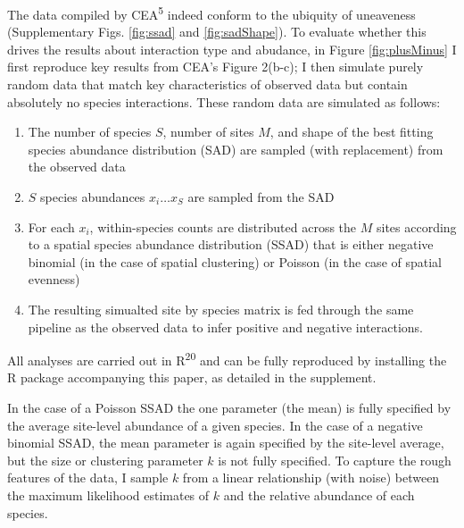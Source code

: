 \documentclass[]{article}
\providecommand{\tightlist}{%
  \setlength{\itemsep}{0pt}\setlength{\parskip}{0pt}}
\begin{document}
The data compiled by CEA\textsuperscript{5} indeed conform to the
ubiquity of uneaveness (Supplementary Figs. \ref{fig:ssad} and
\ref{fig:sadShape}). To evaluate whether this drives the results about
interaction type and abudance, in Figure \ref{fig:plusMinus} I first
reproduce key results from CEA's Figure 2(b-c); I then simulate purely
random data that match key characteristics of observed data but contain
absolutely no species interactions. These random data are simulated as
follows:

\begin{enumerate}
\def\labelenumi{\arabic{enumi})}
\tightlist
\item
  The number of species \(S\), number of sites \(M\), and shape of the
  best fitting species abundance distribution (SAD) are sampled (with
  replacement) from the observed data
\item
  \(S\) species abundances \(x_i \ldots x_S\) are sampled from the SAD
\item
  For each \(x_i\), within-species counts are distributed across the
  \(M\) sites according to a spatial species abundance distribution
  (SSAD) that is either negative binomial (in the case of spatial
  clustering) or Poisson (in the case of spatial evenness)
\item
  The resulting simualted site by species matrix is fed through the same
  pipeline as the observed data to infer positive and negative
  interactions.
\end{enumerate}

All analyses are carried out in R\textsuperscript{20} and can be fully
reproduced by installing the R package accompanying this paper, as
detailed in the supplement.

In the case of a Poisson SSAD the one parameter (the mean) is fully
specified by the average site-level abundance of a given species. In the
case of a negative binomial SSAD, the mean parameter is again specified
by the site-level average, but the size or clustering parameter \(k\) is
not fully specified. To capture the rough features of the data, I sample
\(k\) from a linear relationship (with noise) between the maximum
likelihood estimates of \(k\) and the relative abundance of each
species.
\end{document}

